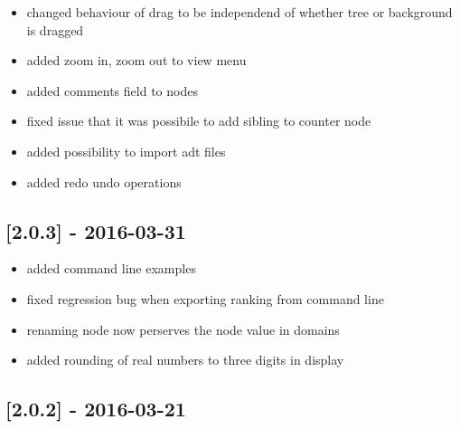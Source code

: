 \begin{itemize}
\tightlist
\item
  changed behaviour of drag to be independend of whether tree or
  background is dragged
\item
  added zoom in, zoom out to view menu
\item
  added comments field to nodes
\item
  fixed issue that it was possibile to add sibling to counter node
\item
  added possibility to import adt files
\item
  added redo undo operations
\end{itemize}

\subsection{{[}2.0.3{]} - 2016-03-31}\label{section-2}

\begin{itemize}
\tightlist
\item
  added command line examples
\item
  fixed regression bug when exporting ranking from command line
\item
  renaming node now perserves the node value in domains
\item
  added rounding of real numbers to three digits in display
\end{itemize}

\subsection{{[}2.0.2{]} - 2016-03-21}\label{section-3}

